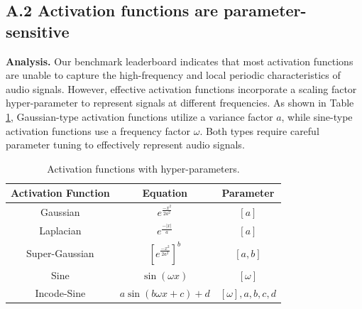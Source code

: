 \documentclass[letterpaper]{article} %
\begin{document}
\subsection{A.2 Activation functions are parameter-sensitive}
\textbf{Analysis.} Our benchmark leaderboard indicates that most activation functions are unable to capture the high-frequency and local periodic characteristics of audio signals. However, effective activation functions incorporate a scaling factor hyper-parameter to represent signals at different frequencies. As shown in Table \ref{tab:hyper_activations}, Gaussian-type activation functions utilize a variance factor \(a\), while sine-type activation functions use a frequency factor \(\omega\). Both types require careful parameter tuning to effectively represent audio signals.

\begin{table}[!h]
    \centering
    \fontsize{9}{11}\selectfont
    \begin{tabular}{c|c|c}
        \hline 
        Activation Function & Equation & Parameter \\
        \hline 
        Gaussian & $e^{\frac{-x^2}{2 a^2}}$ & $[a]$ \\
        \hline
        Laplacian & $e^{\frac{-|x|}{a}}$ & $[a]$ \\
        \hline
        
        Super-Gaussian & $[e^{\frac{-x^2}{2 a^2}}]^b$ & $[a, b]$ \\
        
        \hline 
        Sine & $\sin (\omega x)$ & $[\omega]$ \\
        
        \hline 
        Incode-Sine & $a \sin (b \omega x+c)+d$ & $[\omega], a, b, c,d$ \\
        \hline
    \end{tabular}
     \caption{Activation functions with hyper-parameters.}
    \label{tab:hyper_activations}
\end{table}
\end{document}

